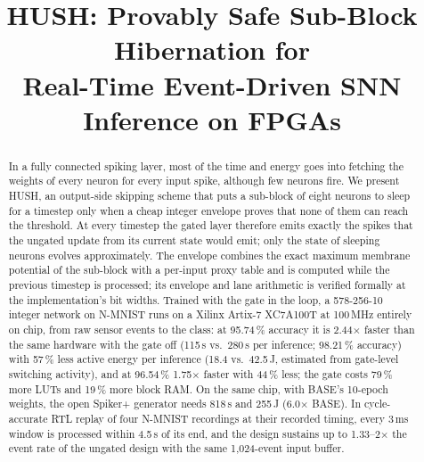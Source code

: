 \documentclass[conference]{IEEEtran}
\begin{document}
\title{HUSH: Provably Safe Sub-Block Hibernation for\\Real-Time Event-Driven SNN Inference on FPGAs}
\author{
}
\maketitle

\begin{abstract}
In a fully connected spiking layer, most of the time and energy goes into fetching the weights of every neuron for
every input spike, although few neurons fire. We present HUSH, an output-side skipping scheme that puts a sub-block
of eight neurons to sleep for a timestep only when a cheap integer envelope proves that none of them can reach the
threshold. At every timestep the gated layer therefore emits exactly the spikes that the ungated update from its
current state would emit; only the state of sleeping neurons evolves approximately. The envelope combines the exact
maximum membrane potential of the sub-block with a per-input proxy table and is computed while the previous timestep
is processed; its envelope and lane arithmetic is verified formally at the implementation's bit widths. Trained with the gate in the loop, a 578-256-10 integer network on N-MNIST
runs on a Xilinx Artix-7 XC7A100T at 100\,MHz entirely on chip, from raw sensor events to the class: at 95.74\,\%
accuracy it is 2.44$\times$ faster than the same hardware with the gate off (115\,\textmu s vs.\ 280\,\textmu s per
inference; 98.21\,\% accuracy) with 57\,\% less active energy per inference (18.4 vs.\ 42.5\,\textmu J,
estimated from gate-level switching activity), and at 96.54\,\% 1.75$\times$ faster with 44\,\% less; the gate
costs 79\,\% more LUTs and 19\,\% more block RAM. On the same chip, with BASE's
10-epoch weights, the open Spiker+ generator needs 818\,\textmu s and 255\,\textmu J (6.0$\times$ BASE). In cycle-accurate RTL replay of
four N-MNIST recordings at their recorded timing, every 3\,ms window is processed within 4.5\,\textmu s of its end,
and the design sustains up to 1.33--2$\times$ the event rate of the ungated design with the same 1,024-event input
buffer.
\end{abstract}
\end{document}
